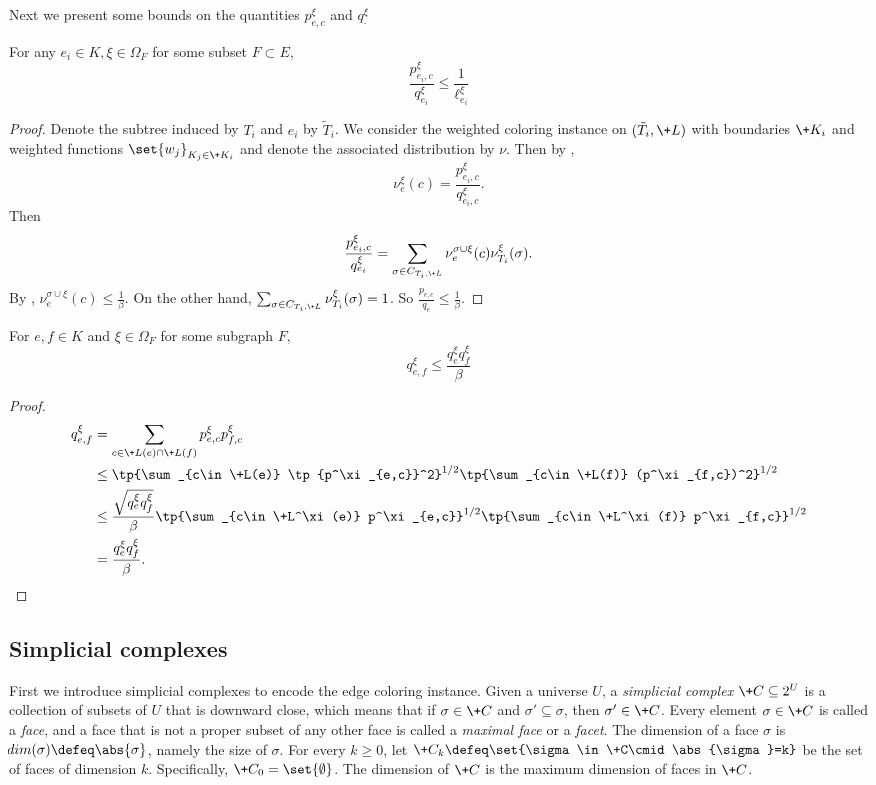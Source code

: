 Next we present some bounds on the quantities $p^\xi_{e, c}$ and $q^\xi_\cdot$
\begin{lemma}\label{lem:marginal-bound-weighted-1}
For any $e_i\in K, \xi\in \Omega_F$ for some subset $F \subset E$,
\[
\frac{p^\xi_{e_i,c}}{q^\xi_{e_i}}\le \frac{1}{\ell^\xi_{e_i}}
\]
\end{lemma}
\begin{proof}
    Denote the subtree induced by $T_i$ and $e_i$ by $\tilde T_i$.
    We consider the weighted coloring instance on $(\tilde T_i, \+L)$ with boundaries
    $\+K_i$ and weighted functions $\set{w_j}_{K_j\in \+K_i}$
    and denote the associated distribution by $\nu$.
    Then by ,
    \[
    \nu^\xi_{e}(c) = \frac{p^\xi_{e_i, c}}{q^\xi_{e_i, c}}.
    \]
    Then
    \[
    \frac{p^\xi_{e_i,c}}{q^\xi_{e_i}}
    =
    \sum_{\sigma\in C_{T_i, \+L}} \nu^{\sigma\cup\xi}_e(c)\nu^\xi_{T_i}(\sigma).
    \]
By ,
$\nu^{\sigma\cup\xi}_e(c)\leq \frac{1}{\beta}$.
On the other hand, $\sum_{\sigma\in C_{T_i, \+L}} \nu^\xi_{T_i}(\sigma)=1$.
So $\frac{p_{e,c}}{q_e}\leq \frac{1}{\beta}$.
\end{proof}
\begin{lemma}\label{lem:marginal-bound-weighted-2}
For $e,f\in K$ and $\xi\in \Omega_F$ for some subgraph $F$,
    \[
    q^\xi_{e,f}\leq \frac{q^\xi_e q^\xi_f}{\beta}
    \]
\end{lemma}
\begin{proof}
\begin{align*}
q^\xi_{e,f}&=\sum_{c\in \+L(e)\cap \+L(f)} p^\xi_{e,c}p^\xi_{f,c}\\
&\leq \tp{\sum_{c\in \+L(e)} \tp{p^\xi_{e,c}}^2}^{1/2} \tp{\sum_{c\in \+L(f)} (p^\xi_{f,c})^2}^{1/2}\\
&\leq \frac{\sqrt{q^\xi_e q^\xi_f}}{\beta}\tp{\sum_{c\in \+L^\xi(e)} p^\xi_{e,c}}^{1/2} \tp{\sum_{c\in \+L^\xi(f)} p^\xi_{f,c}}^{1/2}\\
&=\frac{q^\xi_e q^\xi_f}{\beta}.
\end{align*}
\end{proof}

\subsection{Simplicial complexes}
First we introduce simplicial complexes to encode the edge coloring instance. Given a universe $U$, a \emph{simplicial complex} $\+C\subseteq 2^U$ is a collection of subsets of $U$ that is downward close, which means that if $\sigma\in \+C$ and $\sigma'\subseteq\sigma$, then $\sigma'\in \+C$. Every element $\sigma\in \+C$ is called a \emph{face}, and a face that is not a proper subset of any other face is called a \emph{maximal face} or a \emph{facet}. The dimension of a face $\sigma$ is $\!{dim}(\sigma)\defeq \abs{\sigma}$, namely the size of $\sigma$. For every $k\ge 0$, let $\+C_k\defeq \set{\sigma\in\+C\cmid \abs{\sigma}=k}$ be the set of faces of dimension $k$. Specifically, $\+C_0=\set{\emptyset}$. The dimension of $\+C$ is the maximum dimension of faces in $\+C$. 

